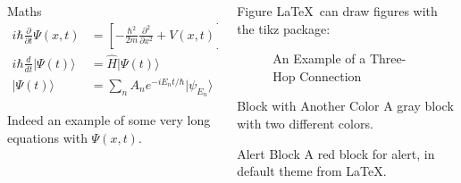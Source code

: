 \documentclass[20pt]{purdue-poster}
\begin{document}
\begin{frame}{}
\begin{columns}[c]
\begin{column}{.48\linewidth}
\begin{block}{Maths}
        \begin{align}
        i\hbar {\frac {\partial }{\partial t}}\Psi (x,t)&=\left[-{\frac {\hbar ^{2}}{2m}}{\frac {\partial ^{2}}{\partial x^{2}}}+V(x,t)\right]\Psi (x,t) \\
        i\hbar {\frac {d}{dt}}\vert \Psi (t)\rangle &={\hat {H}}\vert \Psi (t)\rangle \\ 
        |\Psi (t)\rangle &=\sum _{n}A_{n}e^{{-iE_{n}t}/\hbar }|\psi _{E_{n}}\rangle
        \end{align}
        
        Indeed an example of some very long equations with $\Psi (x,t)$.
    \end{block}
    
    \end{column}

    \begin{column}{.48\linewidth}
    
    \begin{block}{Figure}
        \LaTeX\ can draw figures with the tikz package:
        \begin{figure}[h]
        \centering
        \caption{An Example of a Three-Hop Connection}
        \label{fig:three-hop}
        \end{figure}
    \end{block}

    \begin{exampleblock}{Block with Another Color}
    A gray block with two different colors.
    \end{exampleblock}

    \begin{alertblock}{Alert Block}
    A red block for alert, in default theme from \LaTeX.


\end{alertblock}
\end{column}
\end{columns}
\end{frame}
\end{document}
